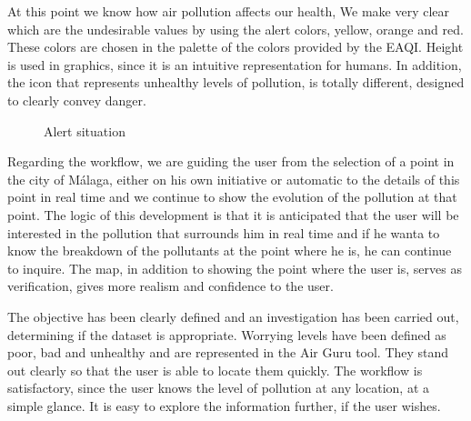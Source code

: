 At this point we know how air pollution affects our health, We make very clear which are the undesirable values by using the alert colors, yellow, orange and 
red. These colors are chosen in the palette of the colors provided by the EAQI.
Height is used in graphics, since it is an intuitive representation for humans. In addition, the icon that represents unhealthy levels of pollution, is
totally different, designed to clearly convey danger. \\
\newpage
\begin{figure}[ht]
    \centering
    \hfill
  
  \caption{Alert situation}
    \end{figure}

    Regarding the workflow, we are guiding the user from the selection of a point in the city of Málaga, either on his own initiative
    or automatic to the details of this point in real time and we continue to show  the evolution of the pollution at that point.
    The logic of this development is that it is anticipated that the user will be interested in the pollution that surrounds him in real time and if
    he wanta to know the breakdown of the pollutants at the point where he is, he can continue to inquire. The map, in addition to showing
    the point where the user is, serves as verification, gives more realism and confidence to the user.

\begin{itemize}
    \done The objective has been clearly defined and an investigation has been carried out, determining if the dataset is appropriate.
    \done Worrying levels have been defined as poor, bad and unhealthy and are represented in the Air Guru tool. They stand out clearly so that the user is able to locate them quickly.
     \done The workflow is satisfactory, since the user knows the level of pollution at any location, at a simple glance. It is easy to explore the information further, if the user wishes.
         
\end{itemize}
 

\newpage